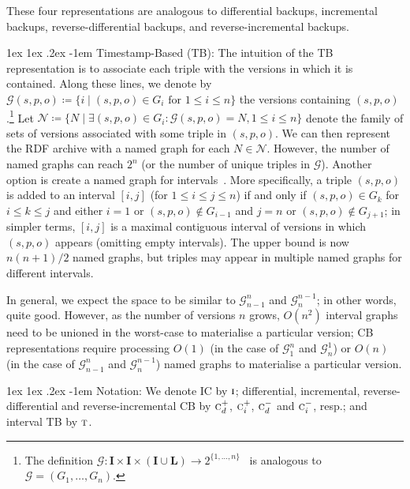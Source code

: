 \documentclass[a4paper]{llncs}
\makeatletter
\renewcommand\paragraph{\@startsection{paragraph}{4}{\z@}%
	{1ex \@plus1ex \@minus.2ex}%
	{-1em}%
	{\normalfont\normalsize\itshape}}
\newcommand{\I}{\ensuremath{\mathbf{I}}\xspace}
\renewcommand{\L}{\ensuremath{\mathbf{L}}\xspace}
\makeatother
\begin{document}
These four representations are analogous to differential backups, incremental backups, reverse-differential backups, and reverse-incremental backups.

\paragraph{Timestamp-Based (TB):} The intuition of the TB representation is to associate each triple with the versions in which it is contained. Along these lines, we denote by $\mathcal{G}(s,p,o) \coloneqq \{ i \mid (s,p,o) \in G_i\text{ for } 1 \leq i \leq n \}$ the versions containing $(s,p,o)$.\footnote{The definition $\mathcal{G} : \I \times \I \times (\I \cup \L) \rightarrow 2^{\{1,\ldots,n\}}$~\cite{FernandezUPK19} is analogous to $\mathcal{G} = (G_1,\ldots,G_n)$.} Let $\mathcal{N} \coloneqq \{ N \mid \exists (s,p,o) \in G_i : \mathcal{G}(s,p,o) = N, 1 \leq i \leq n  \}$ denote the family of sets of versions associated with some triple in $(s,p,o)$. We can then represent the RDF archive with a named graph for each $N \in \mathcal{N}$. However, the number of named graphs can reach $2^n$ (or the number of unique triples in $\mathcal{G}$). Another option is create a named graph for intervals~\cite{FernandezPU15}. More specifically, a triple $(s,p,o)$ is added to an interval $[i,j]$ (for $1 \leq i \leq j \leq n$) if and only if $(s,p,o) \in G_k$ for $i \leq k \leq j$ and either $i = 1$ or $(s,p,o) \notin G_{i-1}$ and $j = n$ or $(s,p,o) \notin G_{j+1}$; in simpler terms, $[i,j]$ is a maximal contiguous interval of versions in which $(s,p,o)$ appears (omitting empty intervals). The upper bound is now $n(n+1)/2$ named graphs, but triples may appear in multiple named graphs for different intervals.

In general, we expect the space to be similar to $\mathcal{G}^n_{n-1}$ and $\mathcal{G}^{n-1}_n$; in other words, quite good. However, as the number of versions $n$ grows, $O(n^2)$ interval graphs need to be unioned in the worst-case to materialise a particular version; CB representations require processing $O(1)$ (in the case of $\mathcal{G}^n_1$ and $\mathcal{G}^1_n$) or $O(n)$ (in the case of $\mathcal{G}^n_{n-1}$ and $\mathcal{G}^{n-1}_n$) named graphs to materialise a particular version. 

\paragraph{Notation:} We denote IC by $\textsc{i}$; differential, incremental, reverse-differential and reverse-incremental CB by $\textsc{c}_d^{+}$, $\textsc{c}_i^{+}$, $\textsc{c}_d^{-}$ and $\textsc{c}_i^{-}$, resp.; and interval TB by $\textsc{t}$.
\end{document}
